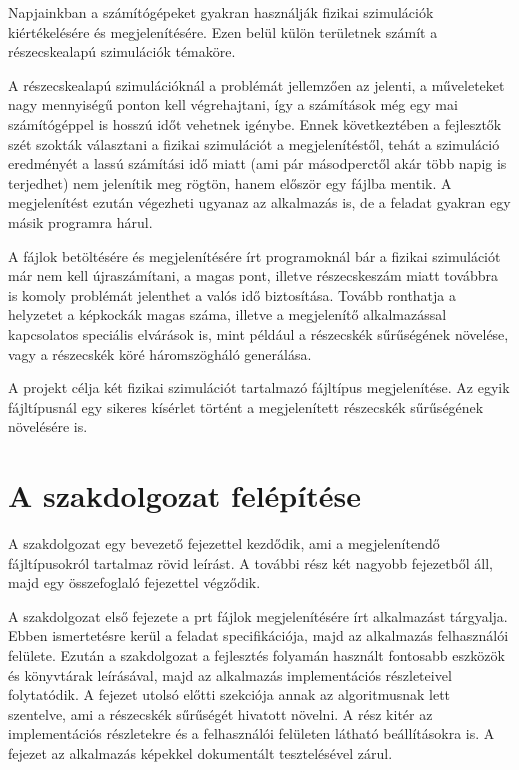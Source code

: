 Napjainkban a számítógépeket gyakran használják
fizikai szimulációk kiértékelésére
és megjelenítésére.
Ezen belül külön területnek számít
a részecskealapú szimulációk témaköre.

A részecskealapú 
szimulációknál a problémát jellemzően az jelenti,
a műveleteket nagy mennyiségű ponton kell végrehajtani,
így a számítások még egy 
mai számítógéppel is hosszú időt vehetnek igénybe.
Ennek következtében a fejlesztők szét szokták választani
a fizikai szimulációt a megjelenítéstől,
tehát a szimuláció eredményét 
a lassú számítási idő miatt
(ami pár másodperctől akár több napig is terjedhet)
nem jelenítik meg rögtön, 
hanem először egy fájlba mentik.
A megjelenítést ezután végezheti 
ugyanaz az alkalmazás is,
de a feladat gyakran egy másik programra hárul.

A fájlok betöltésére és megjelenítésére írt programoknál
bár a fizikai szimulációt már nem kell újraszámítani,
a magas pont, illetve részecskeszám miatt 
továbbra is komoly problémát
jelenthet a valós idő biztosítása.
Tovább ronthatja a helyzetet a képkockák magas száma,
illetve a megjelenítő alkalmazással kapcsolatos
speciális elvárások is, 
mint például a részecskék sűrűségének növelése,
vagy a részecskék köré háromszögháló generálása.

A projekt célja két fizikai szimulációt 
tartalmazó fájltípus megjelenítése.
Az egyik fájltípusnál egy sikeres kísérlet történt 
a megjelenített részecskék sűrűségének növelésére is.

\section{A szakdolgozat felépítése}

A szakdolgozat egy bevezető fejezettel kezdődik,
ami a megjelenítendő fájltípusokról tartalmaz
rövid leírást.
A további rész két nagyobb fejezetből áll, 
majd egy összefoglaló fejezettel végződik.

A szakdolgozat első fejezete a prt fájlok megjelenítésére
írt alkalmazást tárgyalja.
Ebben ismertetésre kerül a feladat specifikációja, 
majd az alkalmazás felhasználói felülete.
Ezután a szakdolgozat a fejlesztés folyamán 
használt fontosabb eszközök 
és könyvtárak leírásával, 
majd az alkalmazás 
implementációs részleteivel folytatódik.
A fejezet utolsó előtti szekciója annak az algoritmusnak lett szentelve,
ami a részecskék sűrűségét hivatott növelni.
A rész kitér az implementációs részletekre
és a felhasználói felületen látható beállításokra is.
A fejezet az alkalmazás képekkel dokumentált tesztelésével zárul.

